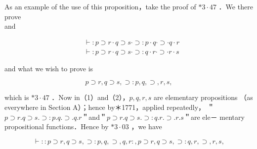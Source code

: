 \documentclass[10pt]{article}
\begin{document}
As an example of the use of this proposition，take the proof of $* 3 \cdot 47$ ．We there prove\\
and


\begin{align*}
& \vdash: p \supset r \cdot q \supset s \cdot \supset: p \cdot q \cdot \supset \cdot q \cdot r  \tag{1}\\
& \vdash: p \supset r \cdot q \supset s \cdot \supset: q \cdot r \cdot \supset \cdot r \cdot s \tag{2}
\end{align*}


and what we wish to prove is

$$
p \supset r, q \supset s, \supset: p, q, \supset, r, s,
$$

which is $* 3 \cdot 47$ ．Now in（1）and（2），$p, q, r, s$ are elementary propositions （as everywhere in Section A）；hence by＊1771，applied repeatedly， ＂$p \supset r . q \supset s . \supset: p . q . \supset . q . r$＂and＂$p \supset r . q \supset s . \supset: q . r . \supset . r . s$＂are ele－ mentary propositional functions．Hence by $* 3 \cdot 03$ ，we have

$$
\vdash:: p \supset r, q \supset s, \supset: p, q, \supset, q, r:, p \supset r, q \supset s, \supset: q, r, \supset, r, s,
$$
\end{document}
